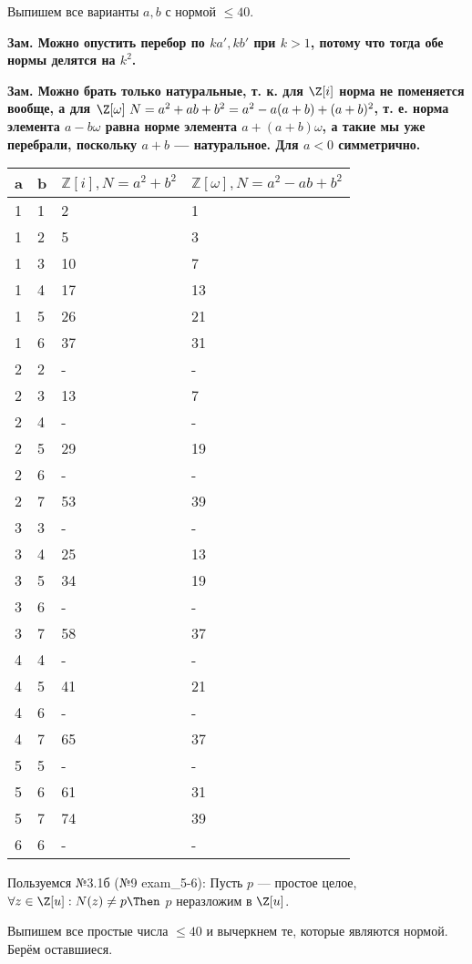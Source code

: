 \begin{solution}

Выпишем все варианты \(a, b\) с нормой \(\le 40\).

\bf{Зам.} Можно опустить перебор по \(ka', kb'\) при \(k > 1\), потому что тогда обе нормы делятся на \(k^2\).

\bf{Зам.} Можно брать только натуральные, т. к. для $\Z[i]$ норма не поменяется вообще, а для $\Z[\omega] \ N =  a^2 + ab + b^2 = a^2 - a (a+b) + (a+b)^2$, т. е. норма элемента $a - b \omega$ равна норме элемента $a + (a+b) \omega$, а такие мы уже перебрали, поскольку $a+b$ --- натуральное. Для $a <0$ симметрично.

\begin{longtable}[]{@{}llll@{}}
\toprule
a & b & \(\mathbb{Z}[i], N = a^2+b^2\) & \(\mathbb{Z}[\omega], N = a^2-ab+b^2\)\tabularnewline
\midrule
\endhead
1 & 1 & 2 & 1\tabularnewline
1 & 2 & 5 & 3\tabularnewline
1 & 3 & 10 & 7\tabularnewline
1 & 4 & 17 & 13\tabularnewline
1 & 5 & 26 & 21\tabularnewline
1 & 6 & 37 & 31\tabularnewline
2 & 2 & - & -\tabularnewline
2 & 3 & 13 & 7\tabularnewline
2 & 4 & - & -\tabularnewline
2 & 5 & 29 & 19\tabularnewline
2 & 6 & - & -\tabularnewline
2 & 7 & 53 & 39\tabularnewline
3 & 3 & - & -\tabularnewline
3 & 4 & 25 & 13\tabularnewline
3 & 5 & 34 & 19\tabularnewline
3 & 6 & - & -\tabularnewline
3 & 7 & 58 & 37\tabularnewline
4 & 4 & - & -\tabularnewline
4 & 5 & 41 & 21\tabularnewline
4 & 6 & - & -\tabularnewline
4 & 7 & 65 & 37\tabularnewline
5 & 5 & - & -\tabularnewline
5 & 6 & 61 & 31\tabularnewline
5 & 7 & 74 & 39\tabularnewline
6 & 6 & - & -\tabularnewline
\bottomrule
\end{longtable}

Пользуемся №3.1б (№9 exam\_5-6): Пусть $p$ --- простое целое, \(\forall z \in \Z[u]: N(z)\ne p \Then\) $p$ неразложим в $\Z[u]$.

Выпишем все простые числа \(\le 40\) и вычеркнем те, которые являются нормой. Берём оставшиеся.


\end{solution}
